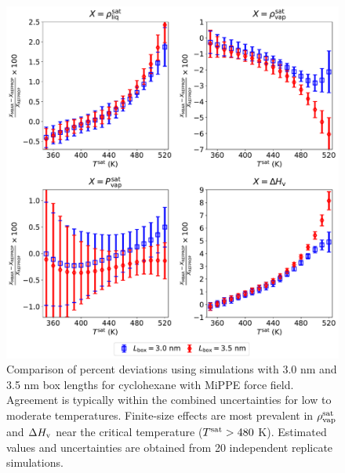 \documentclass[journal=jctc,manuscript=article]{achemso}
\begin{document}
	\begin{figure}[H]
		\centering
		\includegraphics[width=5.8in]{CYC6_deviations_finite_size_effects.pdf}
		\caption{Comparison of percent deviations using simulations with 3.0 nm and 3.5 nm box lengths for cyclohexane with MiPPE force field. Agreement is typically within the combined uncertainties for low to moderate temperatures. Finite-size effects are most prevalent in $\rho_{\rm vap}^{\rm sat}$ and $\Delta H_{\rm v}$ near the critical temperature ($T^{\rm sat} > 480$ K). Estimated values and uncertainties are obtained from 20 independent replicate simulations.}
		\label{SI fig:CYC6_finite_size_effects}
	\end{figure}

	\newpage
	\clearpage
\end{document}
